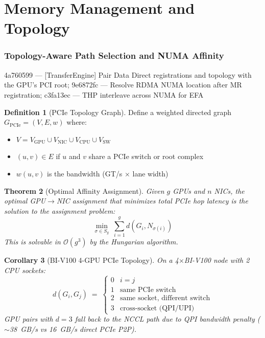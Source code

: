 \documentclass[11pt,a4paper,twoside]{article}
\theoremstyle{plain}
\newtheorem{theorem}{Theorem}[section]
\newtheorem{corollary}[theorem]{Corollary}
\theoremstyle{definition}
\newtheorem{definition}[theorem]{Definition}
\theoremstyle{remark}
\newcommand{\BigO}{\mathcal{O}}
\begin{document}

\part{Memory Management and Topology}

\section{Topology-Aware Path Selection and NUMA Affinity}
\label{sec:topology}

\begin{commitbox}{4a760599 --- [TransferEngine] Pair Data Direct registrations and
topology with the GPU's PCI root; 9e6872fc --- Resolve RDMA NUMA location after MR
registration; c3fa13ec --- THP interleave across NUMA for EFA}
\end{commitbox}

\begin{definition}[PCIe Topology Graph]
\label{def:pcie-graph}
Define a weighted directed graph $G_{\text{PCIe}} = (V, E, w)$ where:
\begin{itemize}[nosep]
  \item $V = V_{\text{GPU}} \cup V_{\text{NIC}} \cup V_{\text{CPU}} \cup V_{\text{SW}}$
  \item $(u,v) \in E$ if $u$ and $v$ share a PCIe switch or root complex
  \item $w(u,v)$ is the bandwidth (GT/s $\times$ lane width)
\end{itemize}
\end{definition}

\begin{theorem}[Optimal Affinity Assignment]
\label{thm:affinity}
Given $g$ GPUs and $n$ NICs, the optimal GPU$\to$NIC assignment that minimizes total
PCIe hop latency is the solution to the assignment problem:
\begin{equation}
  \min_{\sigma \in S_g} \;\sum_{i=1}^{g} d(G_i, N_{\sigma(i)})
\end{equation}
This is solvable in $\BigO(g^3)$ by the Hungarian algorithm.
\end{theorem}

\begin{corollary}[BI-V100 4-GPU PCIe Topology]
\label{cor:biv100-topo}
On a 4$\times$BI-V100 node with 2 CPU sockets:
\begin{equation}
  d(G_i, G_j) \;=\;
  \begin{cases}
    0 & i = j\\
    1 & \text{same PCIe switch}\\
    2 & \text{same socket, different switch}\\
    3 & \text{cross-socket (QPI/UPI)}
  \end{cases}
\end{equation}
GPU pairs with $d=3$ fall back to the NCCL path due to QPI bandwidth penalty
($\sim$38~GB/s vs 16~GB/s direct PCIe P2P).
\end{corollary}
\end{document}
